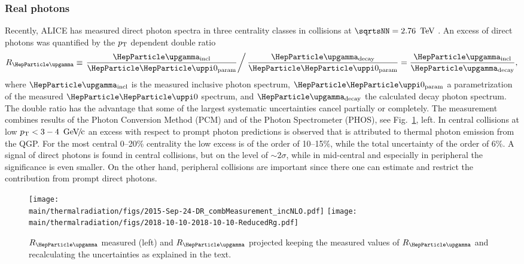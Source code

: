 \subsubsection{Real photons}

Recently, ALICE has measured direct photon spectra in three centrality classes in \PbPb collisions at $\sqrtsNN=\unit[2.76]{\UTeV}$ \cite{Adam:2015lda}. 
An excess of direct photons
was quantified by the $p\sb{\scriptstyle\mathrm{T}}$ dependent double ratio
\begin{equation}
  \label{eq:doubleratio}
  R_{\PGg}  \equiv \left . \frac{\PGg_{\mathrm{incl}}}{\PGpz_{\mathrm{param}}} \right / \frac{\PGg_{\mathrm{decay}}}{\PGpz_{\mathrm{param}}}
 = \frac{\PGg_{\mathrm{incl}}}{\PGg_{\mathrm{decay}}}, 
\end{equation}
where $\PGg_{\mathrm{incl}}$ is the measured inclusive photon spectrum, $\PGpz_{\mathrm{param}}$ a parametrization of the measured $\PGpz$ spectrum, and $\PGg_{\mathrm{decay}}$ the calculated decay photon spectrum. The double ratio has the advantage that some of the largest systematic uncertainties cancel partially or completely. 
The measurement combines results of the Photon Conversion Method (PCM) and of the Photon Spectrometer (PHOS), see Fig.~\ref{fig:RealPhotonsRg}, left. In central collisions at low $\pT  < \unit[3-4]{\UGeVc}$ an excess with respect to prompt photon predictions is observed that is attributed to thermal photon emission from the QGP. For the most central 0--20\% centrality the low \pT{} excess is of the order of 10--15\%, while the total uncertainty of the order of 6\%. A signal of direct photons is found in central collisions, but on the level of $\sim 2\sigma$, while in mid-central and especially in peripheral the significance is even smaller. On the other hand, peripheral collisions are important since there one can estimate and restrict the contribution from prompt direct photons.  

\begin{figure}[hbt]
\centering
\texttt{[image: \\main/thermalradiation/figs/2015-Sep-24-DR\_combMeasurement\_incNLO.pdf]}
\hfill
\texttt{[image: \\main/thermalradiation/figs/2018-10-10-2018-10-10-ReducedRg.pdf]}
\caption{$R_{\PGg}$ measured \cite{Adam:2015lda} (left) and $R_{\PGg}$ projected keeping the measured values of $R_{\PGg}$ and recalculating the uncertainties as explained in the text.}
\label{fig:RealPhotonsRg}
\end{figure}

